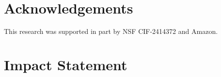 \documentclass{article}
\theoremstyle{plain}
\theoremstyle{definition}
\theoremstyle{remark}
\begin{document}



\section*{Acknowledgements}
This research was supported in part by NSF CIF-2414372 and Amazon.


\section*{Impact Statement}

\end{document}
